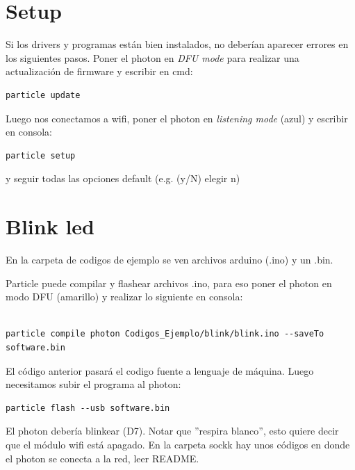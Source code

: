 \documentclass[12pt]{article}
\begin{document}
\section{Setup}

Si los drivers y programas están bien instalados, no deberían aparecer errores en los siguientes pasos.
\medskip
Poner el photon en \textit{DFU mode} para realizar una actualización de firmware y escribir en cmd: 
\medskip
\begin{verbatim}
particle update
\end{verbatim}
\medskip
Luego nos conectamos a wifi, poner el photon en \textit{listening mode} (azul) y escribir en consola:
\medskip
\begin{verbatim}
particle setup
\end{verbatim}
\medskip
y seguir todas las opciones default (e.g. (y/N) elegir n)

\section{Blink led}

En la carpeta de codigos de ejemplo se ven archivos arduino (.ino) y un .bin.

\medskip

Particle puede compilar y flashear archivos .ino, para eso poner el photon en modo DFU (amarillo) y realizar lo siguiente en consola:

\medskip

\begin{verbatim}

particle compile photon Codigos_Ejemplo/blink/blink.ino --saveTo software.bin
\end{verbatim}
\medskip
El código anterior pasará el codigo fuente a lenguaje de máquina. Luego necesitamos subir el programa al photon:
\medskip
\begin{verbatim}
particle flash --usb software.bin
\end{verbatim}
\medskip
El photon debería blinkear (D7). Notar que ''respira blanco'', esto quiere decir que el módulo wifi está apagado. En la carpeta sockk hay unos códigos en donde el photon se conecta a la red, leer README.
\end{document}
